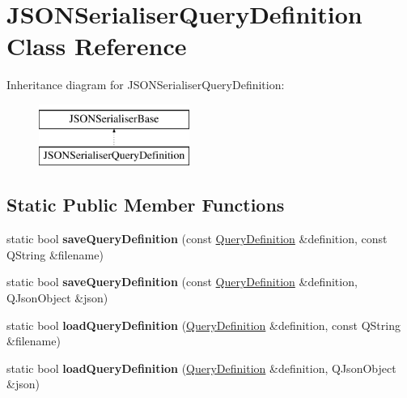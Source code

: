 \hypertarget{class_j_s_o_n_serialiser_query_definition}{}\section{J\+S\+O\+N\+Serialiser\+Query\+Definition Class Reference}
\label{class_j_s_o_n_serialiser_query_definition}
Inheritance diagram for J\+S\+O\+N\+Serialiser\+Query\+Definition\+:\begin{figure}[H]
\begin{center}
\leavevmode
\includegraphics[height=2.000000cm]{class_j_s_o_n_serialiser_query_definition}
\end{center}
\end{figure}
\subsection*{Static Public Member Functions}
\begin{DoxyCompactItemize}
\item 
\mbox{\label{class_j_s_o_n_serialiser_query_definition_a54ea240813fdde029a478bc8a498d356}} 
static bool {\bfseries save\+Query\+Definition} (const \hyperlink{class_query_definition}{Query\+Definition} \&definition, const Q\+String \&filename)
\item 
\mbox{\label{class_j_s_o_n_serialiser_query_definition_afb6eaaf4e5d6e09c4a66bb564912ee23}} 
static bool {\bfseries save\+Query\+Definition} (const \hyperlink{class_query_definition}{Query\+Definition} \&definition, Q\+Json\+Object \&json)
\item 
\mbox{\label{class_j_s_o_n_serialiser_query_definition_a335d270552c2f3e5f8ae545f1e83f7b8}} 
static bool {\bfseries load\+Query\+Definition} (\hyperlink{class_query_definition}{Query\+Definition} \&definition, const Q\+String \&filename)
\item 
\mbox{\label{class_j_s_o_n_serialiser_query_definition_ad6a270c8fd9e25cd5228bf6ded05afd4}} 
static bool {\bfseries load\+Query\+Definition} (\hyperlink{class_query_definition}{Query\+Definition} \&definition, Q\+Json\+Object \&json)
\end{DoxyCompactItemize}


